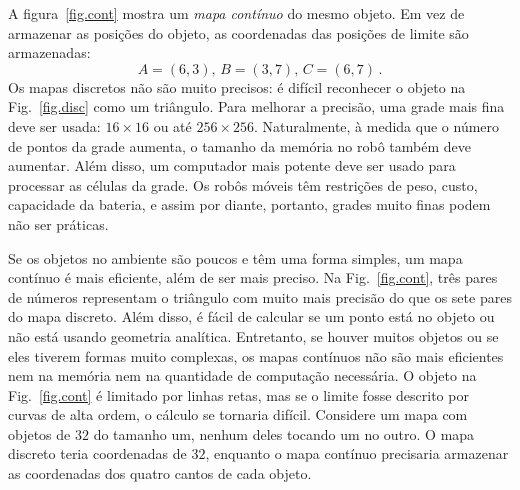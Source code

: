 
A figura~\ref{fig.cont} mostra um \emph{mapa contínuo} do mesmo objeto. Em vez de armazenar as posições do objeto, as coordenadas das posições de limite são armazenadas:
\[
A = (6,3),\, B = (3,7),\, C = (6,7)\,.
\]
Os mapas discretos não são muito precisos: é difícil reconhecer o objeto na Fig.~\ref{fig.disc} como um triângulo. Para melhorar a precisão, uma grade mais fina deve ser usada: $16\times 16$ ou até $256\times 256$. Naturalmente, à medida que o número de pontos da grade aumenta, o tamanho da memória no robô também deve aumentar. Além disso, um computador mais potente deve ser usado para processar as células da grade. Os robôs móveis têm restrições de peso, custo, capacidade da bateria, e assim por diante, portanto, grades muito finas podem não ser práticas. 

Se os objetos no ambiente são poucos e têm uma forma simples, um mapa contínuo é mais eficiente, além de ser mais preciso. Na Fig.~\ref{fig.cont}, três pares de números representam o triângulo com muito mais precisão do que os sete pares do mapa discreto. Além disso, é fácil de calcular se um ponto está no objeto ou não está usando geometria analítica. Entretanto, se houver muitos objetos ou se eles tiverem formas muito complexas, os mapas contínuos não são mais eficientes nem na memória nem na quantidade de computação necessária. O objeto na Fig.~\ref{fig.cont} é limitado por linhas retas, mas se o limite fosse descrito por curvas de alta ordem, o cálculo se tornaria difícil. Considere um mapa com objetos de $32$ do tamanho um, nenhum deles tocando um no outro. O mapa discreto teria coordenadas de $32$, enquanto o mapa contínuo precisaria armazenar as coordenadas dos quatro cantos de cada objeto.

